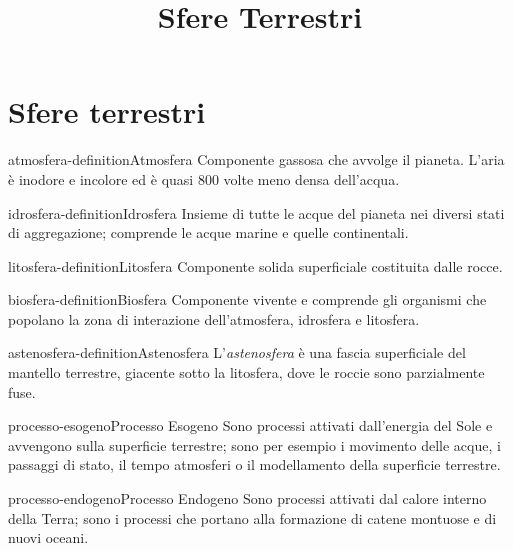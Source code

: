 \documentclass[preview]{standalone}
\begin{document}
\title{Sfere Terrestri}
\genpage

\section{Sfere terrestri}


\begin{snippetdefinition}{atmosfera-definition}{Atmosfera}
    Componente gassosa che avvolge il pianeta. L'aria è inodore e incolore ed è quasi 800 volte meno densa dell'acqua.
\end{snippetdefinition}

\begin{snippetdefinition}{idrosfera-definition}{Idrosfera}
    Insieme di tutte le acque del pianeta nei diversi stati di aggregazione; comprende le acque marine e quelle continentali.
\end{snippetdefinition}
    
\begin{snippetdefinition}{litosfera-definition}{Litosfera}
    Componente solida superficiale costituita dalle rocce.
\end{snippetdefinition}

\begin{snippetdefinition}{biosfera-definition}{Biosfera}
    Componente vivente e comprende gli organismi che popolano la zona di interazione dell'atmosfera, idrosfera e litosfera.
\end{snippetdefinition}

\begin{snippetdefinition}{astenosfera-definition}{Astenosfera}
    L'\textit{astenosfera} è una fascia superficiale del mantello terrestre, giacente sotto la litosfera,
    dove le roccie sono parzialmente fuse.
\end{snippetdefinition}

\begin{snippetdefinition}{processo-esogeno}{Processo Esogeno}
    Sono processi attivati dall'energia del Sole e avvengono sulla superficie terrestre; sono per esempio i movimento delle acque, i passaggi di stato, il tempo atmosferi o il modellamento della superficie terrestre.
\end{snippetdefinition}

\begin{snippetdefinition}{processo-endogeno}{Processo Endogeno}
    Sono processi attivati dal calore interno della Terra; sono i processi che portano alla formazione di catene montuose e di nuovi oceani.
\end{snippetdefinition}

\end{document}
